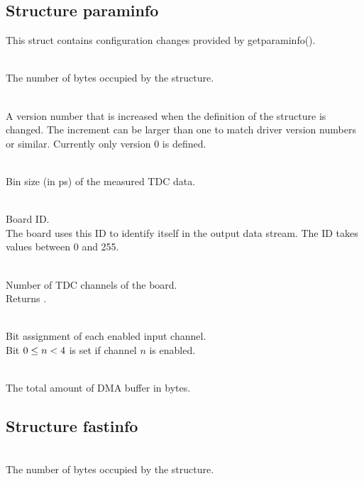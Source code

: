
\subsection{Structure \prefix param\tu info}
This struct contains configuration changes provided by \textsf{\prefix get\tu param\tu info()}.

\\
The number of bytes occupied by the structure. \par

\\
A version number that is increased when the definition of the structure is changed. The increment can be larger than one to match driver version numbers or similar. Currently only version 0 is defined.\par


\\
Bin size (in ps) of the measured TDC data.

\\
Board ID.\\
The board uses this ID to identify itself in the output data stream. The ID takes values between 0 and 255.\par

\\
Number of TDC channels of the board.\\
Returns .\par

\\
Bit assignment of each enabled input channel.\\
Bit $0 \leq n < \ifxHPTDC{8}{4}$ is set if channel $n$ is enabled. \par

\\
The total amount of DMA buffer in bytes.


\subsection{Structure \prefix fast\tu info}

\\
The number of bytes occupied by the structure. \par

